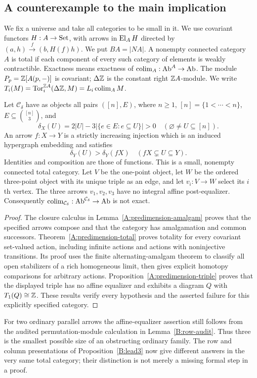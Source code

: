 \subsection{A counterexample to the main implication}
We fix a universe and take all categories to be small in it. We use
covariant functors $H:A\to\mathrm{Set}$, with arrows in $\operatorname{El}_AH$ directed by
$(a,h)\xrightarrow{f}(b,H(f)h)$. We put $BA=|NA|$. A nonempty connected
category $A$ is total if each component of every such category of
elements is weakly contractible. Exactness means exactness of
$\operatorname*{colim}_A:\mathrm{Ab}^A\to\mathrm{Ab}$. The module $P_p=\mathbb Z[A(p,-)]$ is covariant;
$\Delta\mathbb Z$ is the constant right $\mathbb Z A$-module. We write
$T_i(M)=\operatorname{Tor}_i^{\mathbb Z A}(\Delta\mathbb Z,M)=L_i\operatorname*{colim}_A M$.

\begin{theorem}\label{A:main}
Let $\mathcal C_\delta$ have as objects all pairs $([n],E)$, where
$n\geq1$, $[n]=\{1<\cdots<n\}$, $E\subseteq\binom{[n]}3$, and
\[
 \delta_X(U)=2|U|-3|\{e\in E:e\subseteq U\}|>0
 \quad(\varnothing\ne U\subseteq[n]).
\]
An arrow $f:X\to Y$ is a strictly increasing injection which is an
induced hypergraph embedding and satisfies
\[
 \delta_Y(U)>\delta_Y(fX)
 \quad(fX\subsetneq U\subseteq Y).
\]
Identities and composition are those of functions. This is a small,
nonempty connected total category. Let $V$ be the one-point object,
let $W$ be the ordered three-point object with its unique triple as
an edge, and let $v_i:V\to W$ select its $i$th vertex. The three
arrows $v_1,v_2,v_3$ have no integral affine post-equalizer.
Consequently $\operatorname*{colim}_{\mathcal C_\delta}:\mathrm{Ab}^{\mathcal C_\delta}\to\mathrm{Ab}$
is not exact.
\end{theorem}
\begin{proof}
The closure calculus in Lemma~\ref{A:predimension-amalgam} proves
that the specified arrows compose and that the category has
amalgamation and common successors. Theorem~\ref{A:predimension-total}
proves totality for every covariant set-valued action, including
infinite actions and actions with noninjective transitions. Its proof
uses the finite alternating-amalgam theorem to classify all open
stabilizers of a rich homogeneous limit, then gives explicit homotopy
comparisons for arbitrary actions. Proposition~\ref{A:predimension-triple}
proves that the displayed triple has no affine equalizer and exhibits
a diagram $Q$ with $T_1(Q)\cong\mathbb Z$. These results verify every
hypothesis and the asserted failure for this explicitly specified
category.
\end{proof}
For two ordinary parallel arrows the affine-equalizer assertion
still follows from the audited permutation-module calculation in
Lemma~\ref{B:row-audit}. Thus three is the smallest possible size
of an obstructing ordinary family. The row and column presentations
of Proposition~\ref{B:lead3} now give different answers in the very
same total category; their distinction is not merely a missing
formal step in a proof.

